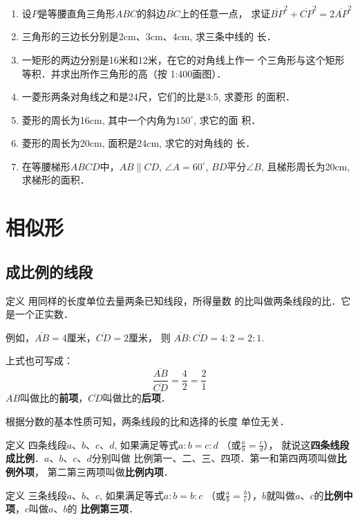 \begin{enumerate}
\item 设$P$是等腰直角三角形$ABC$的斜边$\overline{BC}$上的任意一点，
求证$\overline{BP}^2+\overline{CP}^2=2\overline{AP}^2$
\item 三角形的三边长分别是2cm、3cm、4cm, 求三条中线的
长．
\item 一矩形的两边分别是16米和12米，在它的对角线上作一
个三角形与这个矩形等积．并求出所作三角形的高（按
1:400画图）．
\item 一菱形两条对角线之和是24尺，它们的比是3:5, 求菱形
的面积．
\item 菱形的周长为16cm, 其中一个内角为$150^{\circ}$, 求它的面
积．
\item 菱形的周长为20cm, 面积是24cm, 求它的对角线的
长．
\item 在等腰梯形$ABCD$中，$AB\parallel CD$, $\angle A=60^{\circ}$, $BD$平分$\angle B$, 且梯形周长为20cm, 求梯形的面积．
\end{enumerate}

\section{相似形}
\subsection{成比例的线段}

\begin{blk}
  {定义} 用同样的长度单位去量两条已知线段，所得量数
的比叫做两条线段的比．它是一个正实数．  
\end{blk}

例如，$\overline{AB}=4$厘米，$\overline{CD}=2$厘米，
则 $\overline{AB}:\overline{CD}=4:2=2:1$.

上式也可写成：
\[\frac{\overline{AB}}{\overline{CD}}=\frac{4}{2}=\frac{2}{1}\]
$\overline{AB}$叫做比的\textbf{前项}，$\overline{CD}$叫做比的\textbf{后项}．

根据分数的基本性质可知，两条线段的比和选择的长度
单位无关．


\begin{blk}
    {定义}
四条线段$a$、$b$、$c$、$d$, 如果满足等式$a:b=c:d$
（或$\frac{a}{b}=\frac{c}{d}$），
就说这\textbf{四条线段成比例}．$a$、$b$、$c$、$d$分别叫做
比例第一、二、三、四项．第一和第四两项叫做\textbf{比例外项}，
第二第三两项叫做\textbf{比例内项}．
\end{blk}

\begin{blk}
    {定义}
三条线段$a$、$b$、$c$, 如果满足等式$a:b=b:c$
（或$\frac{a}{b}=\frac{b}{c}$），$b$就叫做$a$、$c$的\textbf{比例中项}，$c$叫做$a$、$b$的
\textbf{比例第三项}．
\end{blk}

